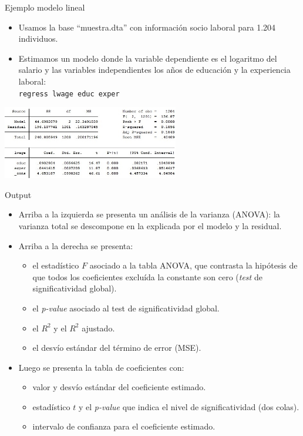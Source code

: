 \documentclass{beamer}
\begin{document}
\begin{frame}{Ejemplo modelo lineal}
\begin{itemize}
\item Usamos la base ``muestra.dta'' con información socio laboral para 1.204 individuos. 
\item Estimamos un modelo donde la variable dependiente es el logaritmo del salario y las variables independientes los años de educación y la experiencia laboral:\\\smallskip
{\footnotesize \texttt{regress lwage educ exper}}
\end{itemize}
\centerline{\includegraphics[height=3.2cm]{reg.jpg}}
\end{frame}

\begin{frame}{Output}
\begin{itemize}
\item Arriba a la izquierda se presenta un análisis de la varianza (ANOVA): la varianza total se descompone en la explicada por el modelo y la residual.
\item Arriba a la derecha se presenta:
\begin{itemize} 
\item el estadístico $F$ asociado a la tabla ANOVA, que contrasta la hipótesis de que todos los coeficientes excluída la constante son cero (\textit{test} de significatividad global).
\item el \textit{p-value} asociado al test de significatividad global.
\item el $R^{2}$ y el $R^{2}$ ajustado.
\item el desvío estándar del término de error (MSE).
\end{itemize}
\item Luego se presenta la tabla de coeficientes con:
\begin{itemize}
\item valor y desvío estándar del coeficiente estimado.
\item estadístico $t$ y el \textit{p-value} que indica el nivel de significatividad (dos colas).
\item intervalo de confianza para el coeficiente estimado.
\end{itemize}
\end{itemize}
\end{frame}
\end{document}
